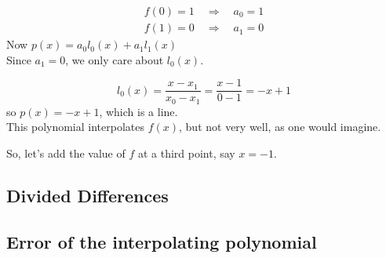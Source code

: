 \begin{equation*}
    \begin{split}
        f(0)=1 \quad \Rightarrow \quad a_0 = 1 \\
        f(1)=0 \quad \Rightarrow \quad a_1 = 0
    \end{split}
\end{equation*}
Now $p(x) = a_0 l_0 (x) + a_1 l_1 (x)$ \\

Since $a_1 = 0$, we only care about $l_0(x)$.

\begin{equation*}
    l_0 (x) = \frac{x-x_1}{x_0-x_1} = \frac{x-1}{0-1} = -x + 1
\end{equation*}
so $p(x) = -x + 1$, which is a line. \\

This polynomial interpolates $f(x)$, but not very well, as one would imagine.

\begin{figure}[H]
    \centering
    
    \label{fig:polynomial-1}
\end{figure}
So, let's add the value of $f$ at a third point, say $x=-1$. 

\subsection{Divided Differences}

\subsection{Error of the interpolating polynomial}

\begin{figure}
  \centering
  \label{}
  \caption{}
  
\end{figure}
\begin{figure}
  \centering
  \label{}
  \caption{}
  
\end{figure}
